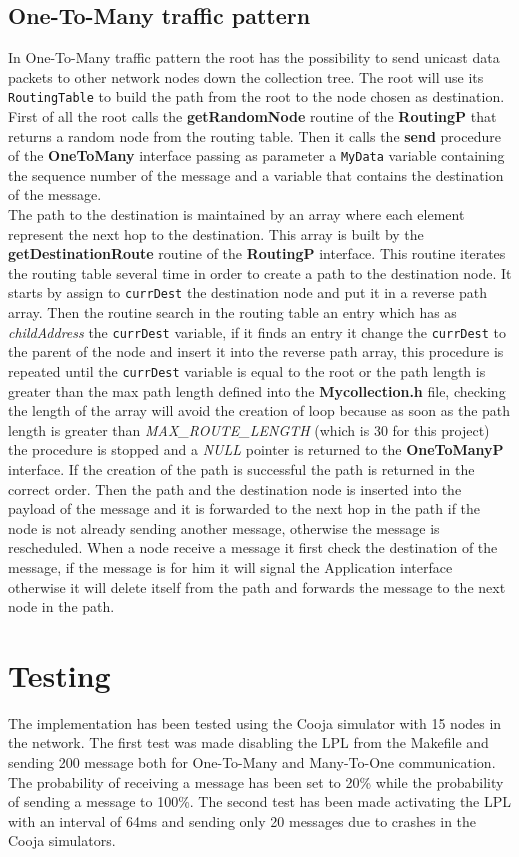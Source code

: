 \documentclass{article}
\begin{document}
    \subsection{One-To-Many traffic pattern}
In One-To-Many traffic pattern the root has the possibility to send unicast data packets to other network nodes down the collection tree. The root will use its \texttt{RoutingTable} to build the path from the root to the node chosen as destination. \\
First of all the root calls the \textbf{getRandomNode} routine of the \textbf{RoutingP} that returns a random node from the routing table. Then it calls the \textbf{send} procedure of the \textbf{OneToMany} interface passing as parameter a \texttt{MyData} variable containing the sequence number of the message and a variable that contains the destination of the message.\\
The path to the destination is maintained by an array where each element represent the next hop to the destination. This array is built by the \textbf{getDestinationRoute} routine of the \textbf{RoutingP} interface. This routine iterates the routing table several time in order to create a path to the destination node. It starts by assign to \texttt{currDest} the destination node and put it in a reverse path array. Then the routine search in the routing table an entry which has as \emph{childAddress} the \texttt{currDest} variable, if it finds an entry it change the \texttt{currDest} to the parent of the node and insert it into the reverse path array, this procedure is repeated until the \texttt{currDest} variable is equal to the root or the path length is greater than the max path length defined into the \textbf{Mycollection.h} file, checking the length of the array will avoid the creation of loop because as soon as the path length is  greater than \emph{MAX\_ROUTE\_LENGTH} (which is 30 for this project) the procedure is stopped and a \emph{NULL} pointer is returned to the \textbf{OneToManyP} interface. If the creation of the path is successful the path is returned in the correct order. Then the path and the destination node is inserted into the payload of the message and it is forwarded to the next hop in the path if the node is not already sending another message, otherwise the message is rescheduled. When a node receive a message it first check the destination of the message, if the message is for him it will signal the Application interface otherwise it will delete itself from the path and forwards the message to the next node in the path.
\section{Testing}
The implementation has been tested using the Cooja simulator with 15 nodes in the network. The first test was made disabling the LPL from the Makefile and sending 200 message both for One-To-Many and Many-To-One communication. The probability of receiving a message has been set to 20\% while the probability of sending a message to 100\%. The second test has been made activating the LPL with an interval of 64ms and sending only 20 messages due to crashes in the Cooja simulators.\\
\end{document}
